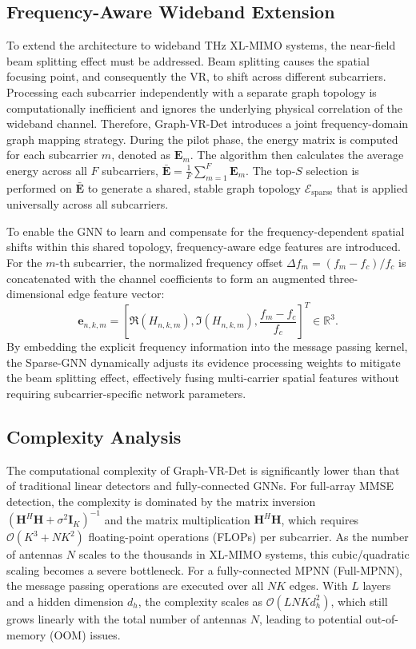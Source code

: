 \subsection{Frequency-Aware Wideband Extension}
To extend the architecture to wideband THz XL-MIMO systems, the near-field beam splitting effect must be addressed. Beam splitting causes the spatial focusing point, and consequently the VR, to shift across different subcarriers. Processing each subcarrier independently with a separate graph topology is computationally inefficient and ignores the underlying physical correlation of the wideband channel. Therefore, Graph-VR-Det introduces a joint frequency-domain graph mapping strategy. During the pilot phase, the energy matrix is computed for each subcarrier $m$, denoted as $\mathbf{E}_m$. The algorithm then calculates the average energy across all $F$ subcarriers, $\bar{\mathbf{E}} = \frac{1}{F} \sum_{m=1}^F \mathbf{E}_m$. The top-$S$ selection is performed on $\bar{\mathbf{E}}$ to generate a shared, stable graph topology $\mathcal{E}_{\text{sparse}}$ that is applied universally across all subcarriers.

To enable the GNN to learn and compensate for the frequency-dependent spatial shifts within this shared topology, frequency-aware edge features are introduced. For the $m$-th subcarrier, the normalized frequency offset $\Delta f_m = (f_m - f_c) / f_c$ is concatenated with the channel coefficients to form an augmented three-dimensional edge feature vector:
\begin{equation}
    \mathbf{e}_{n,k,m} = \left[ \Re(H_{n,k,m}), \Im(H_{n,k,m}), \frac{f_m - f_c}{f_c} \right]^T \in \mathbb{R}^3.
\end{equation}
By embedding the explicit frequency information into the message passing kernel, the Sparse-GNN dynamically adjusts its evidence processing weights to mitigate the beam splitting effect, effectively fusing multi-carrier spatial features without requiring subcarrier-specific network parameters.

\subsection{Complexity Analysis}
The computational complexity of Graph-VR-Det is significantly lower than that of traditional linear detectors and fully-connected GNNs. For full-array MMSE detection, the complexity is dominated by the matrix inversion $(\mathbf{H}^H \mathbf{H} + \sigma^2 \mathbf{I}_K)^{-1}$ and the matrix multiplication $\mathbf{H}^H \mathbf{H}$, which requires $\mathcal{O}(K^3 + NK^2)$ floating-point operations (FLOPs) per subcarrier. As the number of antennas $N$ scales to the thousands in XL-MIMO systems, this cubic/quadratic scaling becomes a severe bottleneck. For a fully-connected MPNN (Full-MPNN), the message passing operations are executed over all $NK$ edges. With $L$ layers and a hidden dimension $d_h$, the complexity scales as $\mathcal{O}(L N K d_h^2)$, which still grows linearly with the total number of antennas $N$, leading to potential out-of-memory (OOM) issues.


